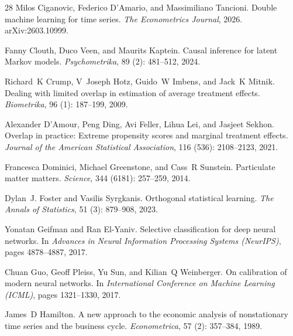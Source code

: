 \documentclass[twoside]{article}
\theoremstyle{definition}
\begin{document}
\begin{thebibliography}{28}
Milos Ciganovic, Federico D'Amario, and Massimiliano Tancioni.
\newblock Double machine learning for time series.
\newblock \emph{The Econometrics Journal}, 2026.
\newblock arXiv:2603.10999.

Fanny Clouth, Duco Veen, and Maurits Kaptein.
\newblock Causal inference for latent Markov models.
\newblock \emph{Psychometrika}, 89 (2): 481--512, 2024.

Richard~K Crump, V~Joseph Hotz, Guido~W Imbens, and Jack~K Mitnik.
\newblock Dealing with limited overlap in estimation of average treatment effects.
\newblock \emph{Biometrika}, 96 (1): 187--199, 2009.

Alexander D'Amour, Peng Ding, Avi Feller, Lihua Lei, and Jasjeet Sekhon.
\newblock Overlap in practice: Extreme propensity scores and marginal treatment effects.
\newblock \emph{Journal of the American Statistical Association}, 116 (536): 2108--2123, 2021.

Francesca Dominici, Michael Greenstone, and Cass~R Sunstein.
\newblock Particulate matter matters.
\newblock \emph{Science}, 344 (6181): 257--259, 2014.

Dylan~J. Foster and Vasilis Syrgkanis.
\newblock Orthogonal statistical learning.
\newblock \emph{The Annals of Statistics}, 51 (3): 879--908, 2023.

Yonatan Geifman and Ran El-Yaniv.
\newblock Selective classification for deep neural networks.
\newblock In \emph{Advances in Neural Information Processing Systems (NeurIPS)}, pages 4878--4887, 2017.

Chuan Guo, Geoff Pleiss, Yu Sun, and Kilian~Q Weinberger.
\newblock On calibration of modern neural networks.
\newblock In \emph{International Conference on Machine Learning (ICML)}, pages 1321--1330, 2017.

James~D Hamilton.
\newblock A new approach to the economic analysis of nonstationary time series and the business cycle.
\newblock \emph{Econometrica}, 57 (2): 357--384, 1989.


\end{thebibliography}
\end{document}
